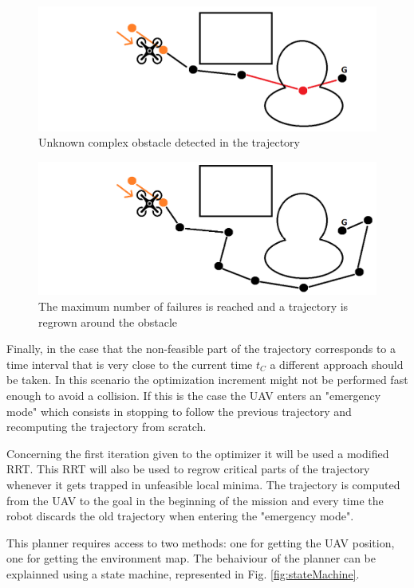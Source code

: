 \begin{figure}[ht!]
   \centering
   \includegraphics[width=0.6\linewidth]{Figures/03_proposed/EXAMPLE_08.png}
   \caption{Unknown complex obstacle detected in the trajectory}
   \label{fig:example08}
\end{figure}

\begin{figure}[ht!]
   \centering
   \includegraphics[width=0.6\linewidth]{Figures/03_proposed/EXAMPLE_09.png}
   \caption{The maximum number of failures is reached and a trajectory is regrown around the obstacle}
   \label{fig:example09}
\end{figure}


\par
Finally, in the case that the non-feasible part of the trajectory corresponds to a time interval that is very close to the current time $t_C$ a different approach should be taken. In this scenario the optimization increment might not be performed fast enough to avoid a collision. If this is the case the UAV enters an "emergency mode" which consists in stopping to follow the previous trajectory and recomputing the trajectory from scratch.
\par
Concerning the first iteration given to the optimizer it will be used a modified RRT. This RRT will also be used to regrow critical parts of the trajectory whenever it gets trapped in unfeasible local minima. The trajectory is computed from the UAV to the goal in the beginning of the mission and every time the robot discards the old trajectory when entering the "emergency mode".
\par
This planner requires access to two methods: one for getting the UAV position, one for getting the environment map. The behaiviour of the planner can be explainned using a state machine, represented in Fig. \ref{fig:stateMachine}.

